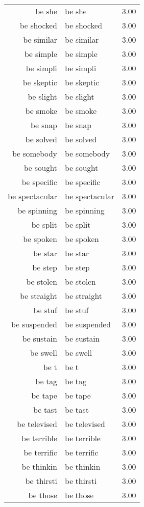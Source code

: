 \begin{table}[ht]
\begin{tabular}{rlr}
  be she & be she & 3.00 \\ 
  be shocked & be shocked & 3.00 \\ 
  be similar & be similar & 3.00 \\ 
  be simple & be simple & 3.00 \\ 
  be simpli & be simpli & 3.00 \\ 
  be skeptic & be skeptic & 3.00 \\ 
  be slight & be slight & 3.00 \\ 
  be smoke & be smoke & 3.00 \\ 
  be snap & be snap & 3.00 \\ 
  be solved & be solved & 3.00 \\ 
  be somebody & be somebody & 3.00 \\ 
  be sought & be sought & 3.00 \\ 
  be specific & be specific & 3.00 \\ 
  be spectacular & be spectacular & 3.00 \\ 
  be spinning & be spinning & 3.00 \\ 
  be split & be split & 3.00 \\ 
  be spoken & be spoken & 3.00 \\ 
  be star & be star & 3.00 \\ 
  be step & be step & 3.00 \\ 
  be stolen & be stolen & 3.00 \\ 
  be straight & be straight & 3.00 \\ 
  be stuf & be stuf & 3.00 \\ 
  be suspended & be suspended & 3.00 \\ 
  be sustain & be sustain & 3.00 \\ 
  be swell & be swell & 3.00 \\ 
  be t & be t & 3.00 \\ 
  be tag & be tag & 3.00 \\ 
  be tape & be tape & 3.00 \\ 
  be tast & be tast & 3.00 \\ 
  be televised & be televised & 3.00 \\ 
  be terrible & be terrible & 3.00 \\ 
  be terrific & be terrific & 3.00 \\ 
  be thinkin & be thinkin & 3.00 \\ 
  be thirsti & be thirsti & 3.00 \\ 
  be those & be those & 3.00 \\ 

\end{tabular}
\end{table}
